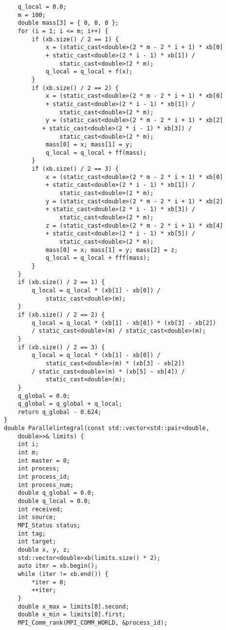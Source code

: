 \documentclass{report}
\begin{document}
\begin{lstlisting}
    q_local = 0.0;
    m = 100;
    double mass[3] = { 0, 0, 0 };
    for (i = 1; i <= m; i++) {
        if (xb.size() / 2 == 1) {
            x = (static_cast<double>(2 * m - 2 * i + 1) * xb[0]
            + static_cast<double>(2 * i - 1) * xb[1]) /
                static_cast<double>(2 * m);
            q_local = q_local + f(x);
        }
        if (xb.size() / 2 == 2) {
            x = (static_cast<double>(2 * m - 2 * i + 1) * xb[0]
            + static_cast<double>(2 * i - 1) * xb[1]) /
                static_cast<double>(2 * m);
            y = (static_cast<double>(2 * m - 2 * i + 1) * xb[2]
           + static_cast<double>(2 * i - 1) * xb[3]) /
                static_cast<double>(2 * m);
            mass[0] = x; mass[1] = y;
            q_local = q_local + ff(mass);
        }
        if (xb.size() / 2 == 3) {
            x = (static_cast<double>(2 * m - 2 * i + 1) * xb[0]
            + static_cast<double>(2 * i - 1) * xb[1]) /
                static_cast<double>(2 * m);
            y = (static_cast<double>(2 * m - 2 * i + 1) * xb[2]
            + static_cast<double>(2 * i - 1) * xb[3]) /
                static_cast<double>(2 * m);
            z = (static_cast<double>(2 * m - 2 * i + 1) * xb[4]
            + static_cast<double>(2 * i - 1) * xb[5]) /
                static_cast<double>(2 * m);
            mass[0] = x; mass[1] = y; mass[2] = z;
            q_local = q_local + fff(mass);
        }
    }
    if (xb.size() / 2 == 1) {
        q_local = q_local * (xb[1] - xb[0]) /
            static_cast<double>(m);
    }
    if (xb.size() / 2 == 2) {
        q_local = q_local * (xb[1] - xb[0]) * (xb[3] - xb[2])
        / static_cast<double>(m) / static_cast<double>(m);
    }
    if (xb.size() / 2 == 3) {
        q_local = q_local * (xb[1] - xb[0]) /
            static_cast<double>(m) * (xb[3] - xb[2])
        / static_cast<double>(m) * (xb[5] - xb[4]) /
            static_cast<double>(m);
    }
    q_global = 0.0;
    q_global = q_global + q_local;
    return q_global - 0.624;
}
double Parallelintegral(const std::vector<std::pair<double,
    double>>& limits) {
    int i;
    int m;
    int master = 0;
    int process;
    int process_id;
    int process_num;
    double q_global = 0.0;
    double q_local = 0.0;
    int received;
    int source;
    MPI_Status status;
    int tag;
    int target;
    double x, y, z;
    std::vector<double>xb(limits.size() * 2);
    auto iter = xb.begin();
    while (iter != xb.end()) {
        *iter = 0;
        ++iter;
    }
    double x_max = limits[0].second;
    double x_min = limits[0].first;
    MPI_Comm_rank(MPI_COMM_WORLD, &process_id);

\end{lstlisting}
\end{document}
